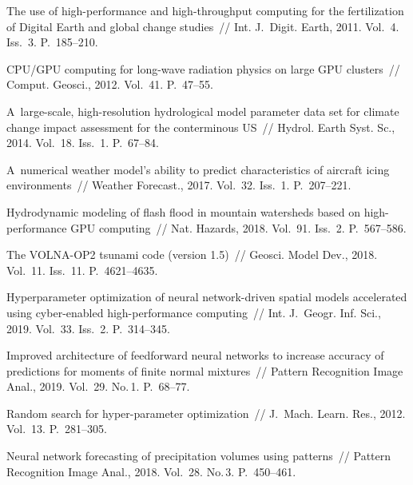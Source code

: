 \begin{multicols}{2}
{{\begin{thebibliography}{99}
  
The use of high-performance and high-throughput computing for the
fertilization of Digital Earth and global change studies~// Int. J.~Digit. Earth, 
2011. Vol.~4. Iss.~3. P.~185--210.

  
CPU/GPU computing for long-wave radiation physics on large GPU clusters~// 
Comput. Geosci., 2012. Vol.~41. P.~47--55.

  A~large-scale, high-resolution hydrological model parameter 
data set for climate change impact assessment for the conterminous US~// 
Hydrol. Earth Syst. Sc., 2014. Vol.~18. Iss.~1. P.~67--84.

  
A~numerical weather model's ability to predict characteristics of aircraft icing 
environments~// Weather Forecast., 2017. Vol.~32. Iss.~1. P.~207--221.

  Hydrodynamic modeling of flash 
flood in mountain watersheds based on high-performance GPU computing~// 
Nat. Hazards, 2018. Vol.~91. Iss.~2. P.~567--586.

  
The VOLNA-OP2 tsunami code (version 1.5)~// Geosci. Model Dev., 
2018. Vol.~11. Iss.~11. P.~4621--4635.

  
Hyperparameter optimization of neural network-driven spatial models
accelerated using cyber-enabled high-performance computing~// 
Int. J.~Geogr. Inf. Sci., 2019. Vol.~33. Iss.~2. P.~314--345.

   
Improved architecture of feedforward neural networks to increase accuracy 
of predictions for moments of finite normal mixtures~// 
Pattern Recognition Image Anal., 2019. Vol.~29. No.\,1. P.~68--77.

   
Random search for hyper-parameter optimization~// J.~Mach. Learn. 
Res., 2012. Vol.~13. P.~281--305.

 Neural
network forecasting of precipitation volumes using patterns~// 
Pattern Recognition Image Anal., 2018. Vol.~28. No.\,3. P.~450--461.


\end{thebibliography}}}
\end{multicols}
